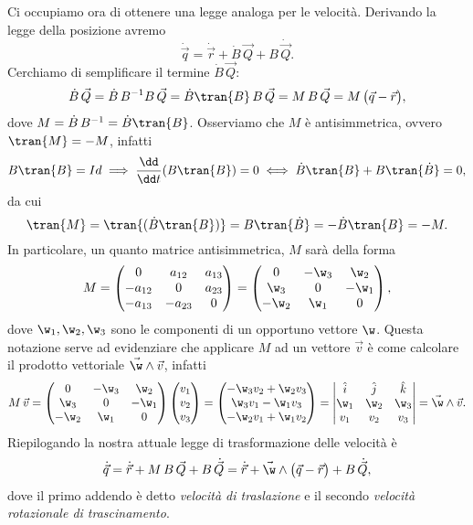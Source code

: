 Ci occupiamo ora di ottenere una legge analoga per le velocità. Derivando la legge della posizione avremo
\[
	\dot{\vec{q}} = \dot{\vec{r}} + \dot{B}\,\vec{Q} + B\,\dot{\vec{Q}}.
\]
Cerchiamo di semplificare il termine \(\dot{B}\,\vec{Q}\):
\[
	\dot{B}\,\vec{Q} = \dot{B}\,B^{-1}B\,\vec{Q} = \dot{B}\tran{B}\,B\,\vec{Q} = M\,B\,\vec{Q} = M\,\big(\vec{q}-\vec{r}\big),
\]
dove \(M=\dot{B}\,B^{-1}=\dot{B}\tran{B}\).
Osserviamo che \(M\) è antisimmetrica, ovvero \(\tran{M}=-M\), infatti
\[
	B\tran{B} = Id \implies \frac{\dd}{\dd t}(B\tran{B}) = 0 \iff \dot{B}\tran{B} + B\tran{\dot{B}} = 0,
\]
da cui
\[
	\tran{M} = \tran{(\dot{B}\tran{B})} = B\tran{\dot{B}} = -\dot{B}\tran{B} = -M.
\]
In particolare, un quanto matrice antisimmetrica, \(M\) sarà della forma
\[
	M = \begin{pmatrix}
		0       & a_{12}  & a_{13} \\
		-a_{12} & 0       & a_{23} \\
		-a_{13} & -a_{23} & 0
	\end{pmatrix} =
	\begin{pmatrix}
		0     & -\w_3 & \w_2  \\
		\w_3  & 0     & -\w_1 \\
		-\w_2 & \w_1  & 0
	\end{pmatrix},
\]
dove \(\w_1,\w_2,\w_3\) sono le componenti di un opportuno vettore \(\w\). Questa notazione serve ad evidenziare che applicare \(M\) ad un vettore \(\vec{v}\) è come calcolare il prodotto vettoriale \(\vec{\w}\wedge\vec{v}\), infatti
\[
	M\,\vec{v} = 	\begin{pmatrix}
		0     & -\w_3 & \w_2  \\
		\w_3  & 0     & -\w_1 \\
		-\w_2 & \w_1  & 0
	\end{pmatrix} \begin{pmatrix}v_1\\v_2\\v_3\end{pmatrix} =
	\begin{pmatrix}
		-\w_3 v_2 + \w_2 v_3 \\
		\w_3 v_1 - \w_1 v_3  \\
		-\w_2 v_1 + \w_1 v_2
	\end{pmatrix} = 
	\begin{vmatrix}
		\hat{i} & \hat{j} & \hat{k} \\
		\w_1    & \w_2    & \w_3    \\
		v_1     & v_2     & v_3
	\end{vmatrix} = \vec{\w} \wedge \vec{v}.
\]
Riepilogando la nostra attuale legge di trasformazione delle velocità è
\[
	\dot{\vec{q}} = \dot{\vec{r}} + M\,B\,\vec{Q} + B\,\dot{\vec{Q}} = \dot{\vec{r}} + \vec{\w}\wedge\big(\vec{q}-\vec{r}\big) + B\,\dot{\vec{Q}},
\]
dove il primo addendo è detto \emph{velocità di traslazione} e il secondo \emph{velocità rotazionale di trascinamento}.

